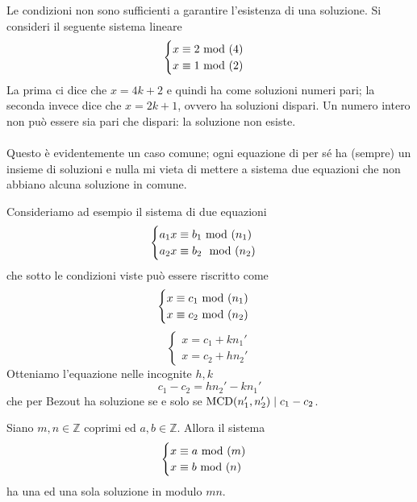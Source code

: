 \begin{controesempio}
	Le condizioni non sono sufficienti a garantire l'esistenza di una soluzione. Si consideri il seguente sistema lineare 
	\begin{equation*}
	\begin{cases}
		x\equiv 2\ \mathrm{mod}\ (4)\\
		x\equiv 1\ \mathrm{mod}\ (2)
	\end{cases}
	\end{equation*}
	La prima ci dice che $x = 4k + 2$ e quindi ha come soluzioni numeri pari; la seconda invece dice che $x = 2k + 1$, ovvero ha soluzioni dispari. Un numero intero non può essere sia pari che dispari: la soluzione non esiste. \\ \\ Questo è evidentemente un caso comune; ogni equazione di per sé ha (sempre) un insieme di soluzioni e nulla mi vieta di mettere a sistema due equazioni che non abbiano alcuna soluzione in comune.
\end{controesempio}
\begin{osservazione}
	Consideriamo ad esempio il sistema di due equazioni
	\begin{equation*}
	\begin{cases}
	a_1x\equiv b_1\ \mathrm{mod}\ (n_1)\\
	a_2x\equiv b_2\mod(n_2)
	\end{cases}
	\end{equation*}
	che sotto le condizioni viste può essere riscritto come 
	\begin{equation*}
	\begin{cases}
	x\equiv c_1\ \mathrm{mod}\ (n_1)\\
	x\equiv c_2\ \mathrm{mod}\ (n_2)
	\end{cases}
	\end{equation*}
	\begin{equation*}
	\begin{cases}
	x=c_1+kn_1'\\
	x=c_2+hn_2'
	\end{cases}
	\end{equation*}
	Otteniamo l'equazione nelle incognite $h,k$
	\begin{equation*}
	c_1-c_2=hn_2'-kn_1'
	\end{equation*}
	che per Bezout ha soluzione se e solo se $\operatorname{\mathrm{MCD}}(n_1',n_2') \mid c_1-c_2$.
\end{osservazione}
\begin{teorema}
	Siano $m,n\in\mathbb{Z}$ coprimi ed $a,b\in\mathbb{Z}$. Allora il sistema 
	\begin{equation*}
	\begin{cases}
	x\equiv a\ \mathrm{mod}\ (m)\\
	x\equiv b\ \mathrm{mod}\ (n)
	\end{cases}
	\end{equation*}
	ha una ed una sola soluzione in modulo $mn$.
\end{teorema}
